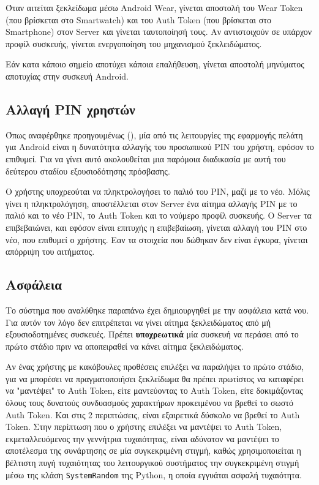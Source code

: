		Όταν αιτείται ξεκλείδωμα μέσω Android Wear, γίνεται αποστολή του Wear Token (που βρίσκεται στο Smartwatch) και του Auth Token (που βρίσκεται στο Smartphone) στον Server και γίνεται ταυτοποίησή τους. Αν αντιστοιχούν σε υπάρχον προφίλ συσκευής, γίνεται ενεργοποίηση του μηχανισμού ξεκλειδώματος.

		Εάν κατα κάποιο σημείο αποτύχει κάποια επαλήθευση, γίνεται αποστολή μηνύματος αποτυχίας στην συσκευή Android.

	\subsection{Αλλαγή PIN χρηστών}
		Όπως αναφέρθηκε προηγουμένως (), μία από τις λειτουργίες της εφαρμογής πελάτη για Android είναι η δυνατότητα αλλαγής του προσωπικού PIN του χρήστη, εφόσον το επιθυμεί. Για να γίνει αυτό ακολουθείται μια παρόμοια διαδικασία με αυτή του δεύτερου σταδίου εξουσιοδότησης πρόσβασης.

		Ο χρήστης υποχρεούται να πληκτρολογήσει το παλιό του PIN, μαζί με το νέο. Μόλις γίνει η πληκτρολόγηση, αποστέλλεται στον Server ένα αίτημα αλλαγής PIN με το παλιό και το νέο PIN, το Auth Token και το νούμερο προφίλ συσκευής. Ο Server τα επιβεβαιώνει, και εφόσον είναι επιτυχής η επιβεβαίωση, γίνεται αλλαγή του PIN στο νέο, που επιθυμεί ο χρήστης. Εαν τα στοιχεία που δώθηκαν δεν είναι έγκυρα, γίνεται απόρριψη του αιτήματος.

	\subsection{Ασφάλεια}
		Το σύστημα που αναλύθηκε παραπάνω έχει δημιουργηθεί με την ασφάλεια κατά νου. Για αυτόν τον λόγο δεν επιτρέπεται να γίνει αίτημα ξεκλειδώματος από μή εξουσιοδοτημένες συσκευές. Πρέπει \textbf{υποχρεωτικά} μία συσκευή να περάσει από το πρώτο στάδιο πριν να αποπειραθεί να κάνει αίτημα ξεκλειδώματος.

		Αν ένας χρήστης με κακόβουλες προθέσεις επιλέξει να παραλήψει το πρώτο στάδιο, για να μπορέσει να πραγματοποιήσει ξεκλείδωμα θα πρέπει πρωτίστος να καταφέρει να "μαντέψει" το Auth Token, είτε μαντεύοντας το Auth Token, είτε δοκιμάζοντας όλους τους δυνατούς συνδυασμούς χαρακτήρων προκειμένου να βρεθεί το σωστό Auth Token. Και στις 2 περιπτώσεις, είναι εξαιρετικά δύσκολο να βρεθεί το Auth Token. Στην περίπτωση που ο χρήστης επιλέξει να μαντέψει το Auth Token, εκμεταλλευόμενος την γεννήτρια τυχαιότητας, είναι αδύνατον να μαντέψει το αποτέλεσμα της συνάρτησης σε μία συγκεκριμένη στιγμή, καθώς χρησιμοποιείται η βέλτιστη πυγή τυχαιότητας του λειτουργικού συστήματος την συγκεκριμένη στιγμή μέσω της κλάση \verb|SystemRandom| της Python, η οποία εγγυάται ασφαλή τυχαιότητα. 

